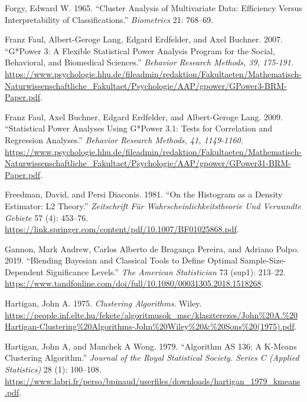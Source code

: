 \documentclass[
]{book}
\newlength{\cslhangindent}
\newenvironment{cslreferences}%
  {\setlength{\parindent}{0pt}%
  \everypar{\setlength{\hangindent}{\cslhangindent}}\ignorespaces}%
  {\par}
\theoremstyle{definition}
\theoremstyle{definition}
\theoremstyle{definition}
\theoremstyle{remark}
\begin{document}
\begin{cslreferences}
\leavevmode\hypertarget{ref-forgy1965cluster}{}%
Forgy, Edward W. 1965. ``Cluster Analysis of Multivariate Data: Efficiency Versus Interpretability of Classifications.'' \emph{Biometrics} 21: 768--69.

\leavevmode\hypertarget{ref-faul2007gpower}{}%
Franz Faul, Albert-Geroge Lang, Edgard Erdfelder, and Axel Buchner. 2007. ``G*Power 3: A Flexible Statistical Power Analysis Program for the Social, Behavioral, and Biomedical Sciences.'' \emph{Behavior Research Methods, 39, 175-191}. \url{https://www.psychologie.hhu.de/fileadmin/redaktion/Fakultaeten/Mathematisch-Naturwissenschaftliche_Fakultaet/Psychologie/AAP/gpower/GPower3-BRM-Paper.pdf}.

\leavevmode\hypertarget{ref-faul2009gpower}{}%
Franz Faul, Axel Buchner, Edgard Erdfelder, and Albert-Geroge Lang. 2009. ``Statistical Power Analyses Using G*Power 3.1: Tests for Correlation and Regression Analyses.'' \emph{Behavior Research Methods, 41, 1149-1160}. \url{https://www.psychologie.hhu.de/fileadmin/redaktion/Fakultaeten/Mathematisch-Naturwissenschaftliche_Fakultaet/Psychologie/AAP/gpower/GPower31-BRM-Paper.pdf}.

\leavevmode\hypertarget{ref-freedman1981histogram}{}%
Freedman, David, and Persi Diaconis. 1981. ``On the Histogram as a Density Estimator: L2 Theory.'' \emph{Zeitschrift Für Wahrscheinlichkeitstheorie Und Verwandte Gebiete} 57 (4): 453--76. \url{https://link.springer.com/content/pdf/10.1007/BF01025868.pdf}.

\leavevmode\hypertarget{ref-gannon2019blending}{}%
Gannon, Mark Andrew, Carlos Alberto de Bragança Pereira, and Adriano Polpo. 2019. ``Blending Bayesian and Classical Tools to Define Optimal Sample-Size-Dependent Significance Levels.'' \emph{The American Statistician} 73 (sup1): 213--22. \url{https://www.tandfonline.com/doi/full/10.1080/00031305.2018.1518268}.

\leavevmode\hypertarget{ref-hartigan1975clustering}{}%
Hartigan, John A. 1975. \emph{Clustering Algorithms}. Wiley. \url{https://people.inf.elte.hu/fekete/algoritmusok_msc/klaszterezes/John\%20A.\%20Hartigan-Clustering\%20Algorithms-John\%20Wiley\%20\&\%20Sons\%20(1975).pdf}.

\leavevmode\hypertarget{ref-hartigan1979algorithm}{}%
Hartigan, John A, and Manchek A Wong. 1979. ``Algorithm AS 136: A K-Means Clustering Algorithm.'' \emph{Journal of the Royal Statistical Society. Series C (Applied Statistics)} 28 (1): 100--108. \url{https://www.labri.fr/perso/bpinaud/userfiles/downloads/hartigan_1979_kmeans.pdf}.


\end{cslreferences}
\end{document}
